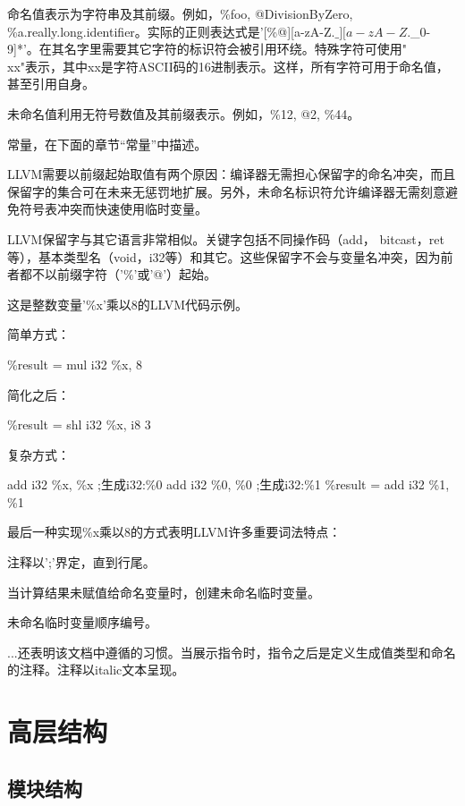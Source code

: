 \documentclass[12pt,a4paper]{article}
\begin{document}
\begin{itermize}
\item 命名值表示为字符串及其前缀。例如，\%foo, @DivisionByZero, \%a.really.long.identifier。实际的正则表达式是'[\%@][a-zA-Z$.\_][a-zA-Z$.\_0-9]*'。在其名字里需要其它字符的标识符会被引用环绕。特殊字符可使用"\\xx"表示，其中xx是字符ASCII码的16进制表示。这样，所有字符可用于命名值，甚至引用自身。
\item 未命名值利用无符号数值及其前缀表示。例如，\%12, @2, \%44。
\item 常量，在下面的章节“常量”中描述。
\end{itermize}

LLVM需要以前缀起始取值有两个原因：编译器无需担心保留字的命名冲突，而且保留字的集合可在未来无惩罚地扩展。另外，未命名标识符允许编译器无需刻意避免符号表冲突而快速使用临时变量。

LLVM保留字与其它语言非常相似。关键字包括不同操作码（add， bitcast，ret等），基本类型名（void，i32等）和其它。这些保留字不会与变量名冲突，因为前者都不以前缀字符（'\%'或'@'）起始。

这是整数变量'\%x'乘以8的LLVM代码示例。

简单方式：

\%result = mul i32 \%x, 8

简化之后：

\%result = shl i32 \%x, i8 3

复杂方式：

add i32 \%x, \%x    ;生成{i32}:\%0
add i32 \%0, \%0    ;生成{i32}:\%1
\%result = add i32 \%1, \%1

最后一种实现\%x乘以8的方式表明LLVM许多重要词法特点：

\begin{iterator}
\item 注释以';'界定，直到行尾。
\item 当计算结果未赋值给命名变量时，创建未命名临时变量。
\item 未命名临时变量顺序编号。
\end{iterator}

...还表明该文档中遵循的习惯。当展示指令时，指令之后是定义生成值类型和命名的注释。注释以italic文本呈现。

\section{高层结构}

\subsection{模块结构}
\end{document}
